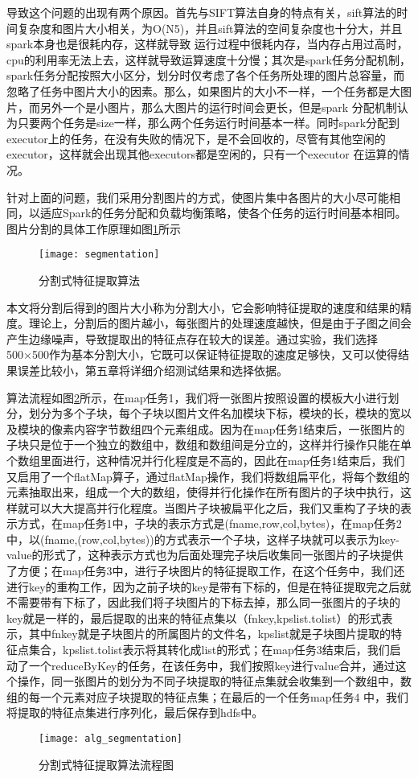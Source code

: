 导致这个问题的出现有两个原因。首先与SIFT算法自身的特点有关，sift算法的时间复杂度和图片大小相关，为O(N5)，并且sift算法的空间复杂度也十分大，并且spark本身也是很耗内存，这样就导致 运行过程中很耗内存，当内存占用过高时，cpu的利用率无法上去，这样就导致运算速度十分慢；其次是spark任务分配机制，spark任务分配按照大小区分，划分时仅考虑了各个任务所处理的图片总容量，而忽略了任务中图片大小的因素。那么，如果图片的大小不一样，一个任务都是大图片，而另外一个是小图片，那么大图片的运行时间会更长，但是spark 分配机制认为只要两个任务是size一样，那么两个任务运行时间基本一样。同时spark分配到executor上的任务，在没有失败的情况下，是不会回收的，尽管有其他空闲的executor，这样就会出现其他executors都是空闲的，只有一个executor 在运算的情况。

针对上面的问题，我们采用分割图片的方式，使图片集中各图片的大小尽可能相同，以适应Spark的任务分配和负载均衡策略，使各个任务的运行时间基本相同。图片分割的具体工作原理如图\ref{fig:segmentation}所示
\begin{figure}[htp]
\centering
\texttt{[image: segmentation]}
\caption{分割式特征提取算法}
\label{fig:segmentation}
\end{figure}

本文将分割后得到的图片大小称为分割大小，它会影响特征提取的速度和结果的精度。理论上，分割后的图片越小，每张图片的处理速度越快，但是由于子图之间会产生边缘噪声，导致提取出的特征点存在较大的误差。通过实验，我们选择500×500作为基本分割大小，它既可以保证特征提取的速度足够快，又可以使得结果误差比较小，第五章将详细介绍测试结果和选择依据。

算法流程如图\ref{fig:alg_segmentation}所示，在map任务1，我们将一张图片按照设置的模板大小进行划分，划分为多个子块，每个子块以图片文件名加模块下标，模块的长，模块的宽以及模块的像素内容字节数组四个元素组成。因为在map任务1结束后，一张图片的子块只是位于一个独立的数组中，数组和数组间是分立的，这样并行操作只能在单个数组里面进行，这种情况并行化程度是不高的，因此在map任务1结束后，我们又启用了一个flatMap算子，通过flatMap操作，我们将数组扁平化，将每个数组的元素抽取出来，组成一个大的数组，使得并行化操作在所有图片的子块中执行，这样就可以大大提高并行化程度。当图片子块被扁平化之后，我们又重构了子块的表示方式，在map任务1中，子块的表示方式是(fname,row,col,bytes)，在map任务2中，以(fname,(row,col,bytes))的方式表示一个子块，这样子块就可以表示为key-value的形式了，这种表示方式也为后面处理完子块后收集同一张图片的子块提供了方便；在map任务3中，进行子块图片的特征提取工作，在这个任务中，我们还进行key的重构工作，因为之前子块的key是带有下标的，但是在特征提取完之后就不需要带有下标了，因此我们将子块图片的下标去掉，那么同一张图片的子块的key就是一样的，最后提取的出来的特征点集以（fnkey,kpslist.tolist）的形式表示，其中fnkey就是子块图片的所属图片的文件名，kpslist就是子块图片提取的特征点集合，kpslist.tolist表示将其转化成list的形式；在map任务3结束后，我们启动了一个reduceByKey的任务，在该任务中，我们按照key进行value合并，通过这个操作，同一张图片的划分为不同子块提取的特征点集就会收集到一个数组中，数组的每一个元素对应子块提取的特征点集；在最后的一个任务map任务4 中，我们将提取的特征点集进行序列化，最后保存到hdfs中。
\begin{figure}[htp]
\centering
\texttt{[image: alg\_segmentation]}
\caption{分割式特征提取算法流程图}
\label{fig:alg_segmentation}
\end{figure}

